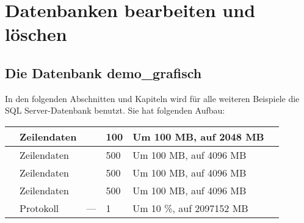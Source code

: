     \section{Datenbanken bearbeiten und löschen}
      \subsection{Die Datenbank demo\_grafisch}
        In den folgenden Abschnitten und Kapiteln wird für alle weiteren
        Beispiele die SQL Server-Datenbank  benutzt.
        Sie hat folgenden Aufbau:
        \begin{center}
          \begin{scriptsize}
            \tablehead{}
            \tabletail {
            }
            \tablelasttail {
            }
            \begin{supertabular}{llll>{\centering}p{2.5cm}p{3.75cm}}
               & Zeilendaten &  & 100 & Um 100 MB,
              auf 2048 MB &  
              \\
              \hline
               & Zeilendaten &  & 500 & Um 100 MB, auf 4096
              MB &   \\
              \hline
               & Zeilendaten &  & 500 &
              Um 100 MB, auf 4096 MB &   \\
              \hline
               & Zeilendaten &  & 500 &
              Um 100 MB, auf 4096 MB &   \\
              \hline
               & Protokoll & --- & 1 & Um 10 \%, auf
              2097152 MB &   \\
            \end{supertabular}
          \end{scriptsize}
        \end{center}
